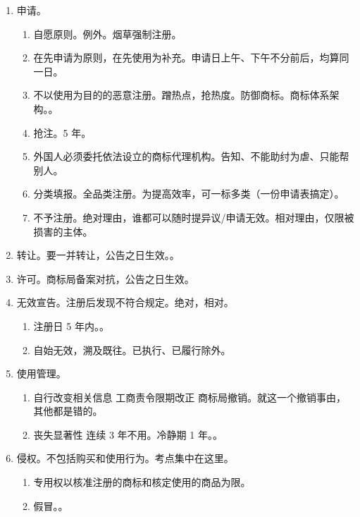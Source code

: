 \begin{enumerate}
\begin{enumerate}
          \item 缺乏显著特征。例外。经过使用后获得显著特征。。
          \item 含有虚假地理标志。例外。作为集体商标、证明商标存在。
        \end{enumerate}
  \item 申请。
        \begin{enumerate}
          \item 自愿原则。例外。烟草强制注册。
          \item 在先申请为原则，在先使用为补充。申请日上午、下午不分前后，均算同一日。
          \item 不以使用为目的的恶意注册。蹭热点，抢热度。防御商标。商标体系架构。。
          \item 抢注。5 年。
          \item 外国人必须委托依法设立的商标代理机构。告知、不能助纣为虐、只能帮别人。
          \item 分类填报。全品类注册。为提高效率，可一标多类（一份申请表搞定）。
          \item 不予注册。绝对理由，谁都可以随时提异议/申请无效。相对理由，仅限被损害的主体。
        \end{enumerate}
  \item 转让。要一并转让，公告之日生效。。
  \item 许可。商标局备案对抗，公告之日生效。
  \item 无效宣告。注册后发现不符合规定。绝对，相对。
        \begin{enumerate}
          \item 注册日 5 年内。。
          \item 自始无效，溯及既往。已执行、已履行除外。
        \end{enumerate}
  \item 使用管理。
        \begin{enumerate}
          \item 自行改变相关信息 \yjt 工商责令限期改正 \yjt 商标局撤销。就这一个撤销事由，其他都是错的。
          \item 丧失显著性 \hz 连续 3 年不用。冷静期 1 年。。
        \end{enumerate}
  \item 侵权。不包括购买和使用行为。考点集中在这里。
        \begin{enumerate}
          \item 专用权以核准注册的商标和核定使用的商品为限。
          \item 假冒。。

\end{enumerate}
\end{enumerate}
